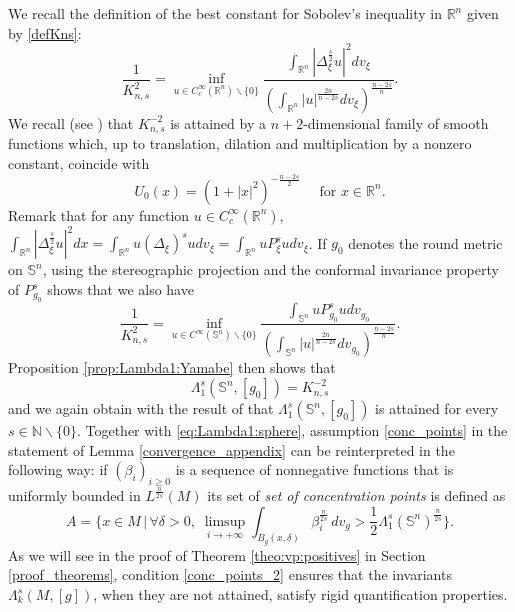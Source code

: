 \documentclass[10pt]{amsart}
\numberwithin{equation}{section}
\newcommand{\R}{\mathbb{R}}
\def\be{{\beta}}
\def\de{{\delta}}
\theoremstyle{plain}
\theoremstyle{remark}
\begin{document}
We recall the definition of the best constant for Sobolev's inequality in $\R^n$ given by \eqref{defKns}:
\begin{equation*}
 \frac{1}{K_{n,s}^2} = \inf_{u \in C^\infty_c(\R^n) \backslash \{0\}} \frac{\int_{\R^n} \left| \Delta_\xi^{\frac{s}{2}} u \right|^2 dv_{\xi}}{\left(\int_{\R^n} |u|^{\frac{2n}{n-2s}} dv_{\xi} \right)^{\frac{n-2s}{n}}}.
 \end{equation*}
We recall (see \cite{LiebSharpConstants}) that $K_{n,s}^{-2}$ is attained by a $n+2$-dimensional family of smooth functions which, up to translation, dilation and multiplication by a nonzero constant, coincide with  
$$ U_0(x) = \left( 1+ |x|^2 \right)^{- \frac{n-2s}{2}}  \quad \text{ for } x \in \R^n. $$
Remark that for any function $u \in C^\infty_c(\R^n)$, $\int_{\R^n} \left| \Delta_\xi^{\frac{s}{2}} u \right|^2 dx = \int_{\R^n} u (\Delta_\xi)^{s}u dv_{\xi} = \int_{\R^n} u P_{\xi}^s u dv_\xi$.  If $g_0$ denotes the round metric on $\mathbb{S}^n$, using the stereographic projection and the conformal invariance property of $P_{g_0}^s$ shows that we also have 
$$ \frac{1}{K_{n,s}^2} = \inf_{u \in C^\infty(\mathbb{S}^n) \backslash \{0\}} \frac{\int_{\mathbb{S}^n} u P_{g_0}^s u dv_{g_0}}{\left(\int_{\mathbb{S}^n} |u|^{\frac{2n}{n-2s}} dv_{g_0} \right)^{\frac{n-2s}{n}}}. $$
Proposition \ref{prop:Lambda1:Yamabe} then shows that
\begin{equation} \label{eq:Lambda1:sphere}
\Lambda_1^s(\mathbb{S}^n, [g_0]) = K_{n,s}^{-2}
\end{equation}
and we again obtain with the result of \cite{LiebSharpConstants} that $\Lambda_1^s(\mathbb{S}^n, [g_0]) $ is attained for every $s \in \mathbb{N} \backslash \{0\}$. Together with \eqref{eq:Lambda1:sphere}, assumption \eqref{conc_points} in the statement of Lemma \ref{convergence_appendix} can be reinterpreted in the following way: if $(\be_i)_{i \ge0}$ is a sequence of nonnegative functions that is uniformly bounded in $L^{\frac{n}{2s}}(M)$ its set of {\em set of concentration points} is defined as 
\begin{equation} \label{conc_points_2}
A=  \Biggl\{ x \in M \,\Big|\, \forall \de>0, \;  \limsup_{i \to + \infty} \int_{B_g(x,\de)}
  \be_i^{\frac{n}{2s}}  \,dv_g > \frac12 \Lambda_1^s(\mathbb{S}^n)^{\frac{n}{2s}} \Biggr\}. 
  \end{equation}
As we will see in the proof of Theorem \ref{theo:vp:positives} in Section \ref{proof_theorems}, condition \eqref{conc_points_2} ensures that the invariants $\Lambda_k^s(M,[g])$, when they are not attained, satisfy rigid quantification properties. 
  
\end{document}
